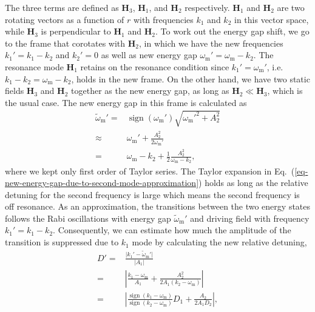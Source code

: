 \documentclass[%
reprint,
 amsmath,amssymb,
 prd,
]{revtex4-1}
\newcommand{\RD}{D}
\DeclareMathOperator{\sign}{sign}
\begin{document}
The three terms are defined as $\mathbf  H_3$, $\mathbf H_1$, and $\mathbf H_2$ respectively. $\mathbf H_1$ and $\mathbf H_2$ are two rotating vectors as a function of $r$ with frequencies $k_1$ and $k_2$ in this vector space, while $\mathbf H_3$ is perpendicular to $\mathbf H_1$ and $\mathbf H_2$. To work out the energy gap shift, we go to the frame that corotates with $\mathbf H_2$, in which we have the new frequencies $k_1'=k_1-k_2$ and $k_2'=0$ as well as new energy gap $\omega_{\mathrm m}' = \omega_{\mathrm m}- k_2$. The resonance mode $\mathbf H_1$ retains on the resonance condition since $k_1'=\omega_{\mathrm m}'$, i.e. $k_1-k_2 = \omega_{\mathrm m}-k_2$, holds in the new frame. On the other hand, we have two static fields $\mathbf H_3$ and $\mathbf H_2$ together as the new energy gap, as long as $\mathbf H_2\ll \mathbf H_3$, which is the usual case. The new energy gap in this frame is calculated as
\begin{align}
    \tilde\omega_{\mathrm{m}}' =& \sign (\omega_{\mathrm m}') \sqrt{\omega_{\mathrm{m}}'^2 + A_2^2 } \nonumber\\
    \approx & \omega_{\mathrm{m}}' + \frac{A_2^2}{2\omega_{\mathrm m}'} \nonumber\\
    =& \omega_{\mathrm m} - k_2 + \frac{1}{2}\frac{A_2^2}{\omega_{\mathrm m} - k_2},
    \label{eq-new-energy-gap-due-to-second-mode-approximation}
\end{align}
where we kept only first order of Taylor series. The Taylor expansion in Eq.~(\ref{eq-new-energy-gap-due-to-second-mode-approximation}) holds as long as the relative detuning for the second frequency is large which means the second frequency is off resonance. As an approximation, the transitions between the two energy states follows the Rabi oscillations with energy gap $\tilde \omega_{\mathrm m}'$ and driving field with frequency $k_1'=k_1-k_2$. Consequently, we can estimate how much the amplitude of the transition is suppressed due to $k_1$ mode by calculating the new relative detuning,
\begin{align}
    \RD' =& \frac{\lvert k_1' - \tilde \omega_{\mathrm m}' \rvert}{\lvert A_1 \rvert}\nonumber\\
    =& \left \lvert \frac{ k_1-\omega_{\mathrm m}}{ A_1} + \frac{ A_2^2 }{2  A_1 ( k_2 - \omega_{\mathrm m})} \right  \rvert\\
    =& \left \lvert  \frac{\sign({ k_1-\omega_{\mathrm m}})}{\sign (k_2 - \omega_{\mathrm m})} \RD_1 +  \frac{ A_2 }{2 A_1 \RD_2 }\right \rvert ,
    \label{eq-relative-detuning-changed}
\end{align}
\end{document}
